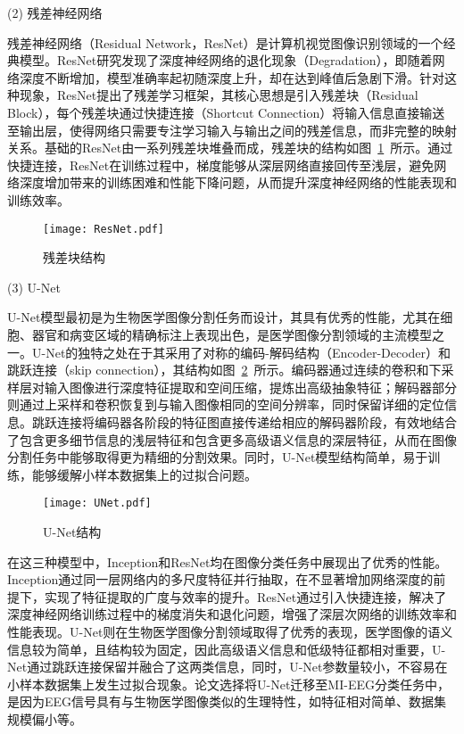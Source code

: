 (2) 残差神经网络

残差神经网络（Residual Network，ResNet）\cite{he2016deep}是计算机视觉图像识别领域的一个经典模型。ResNet研究发现了深度神经网络的退化现象（Degradation），即随着网络深度不断增加，模型准确率起初随深度上升，却在达到峰值后急剧下滑。针对这种现象，ResNet提出了残差学习框架，其核心思想是引入残差块（Residual Block），每个残差块通过快捷连接（Shortcut Connection）将输入信息直接输送至输出层，使得网络只需要专注学习输入与输出之间的残差信息，而非完整的映射关系。基础的ResNet由一系列残差块堆叠而成，残差块的结构如图~\ref{fig:ResNet}~所示。通过快捷连接，ResNet在训练过程中，梯度能够从深层网络直接回传至浅层，避免网络深度增加带来的训练困难和性能下降问题，从而提升深度神经网络的性能表现和训练效率。
\begin{figure}
  \centering
  \texttt{[image: ResNet.pdf]}
  \caption{残差块结构}
  \label{fig:ResNet}
\end{figure}

(3) U-Net

U-Net模型\cite{ronneberger2015u}最初是为生物医学图像分割任务而设计，其具有优秀的性能，尤其在细胞、器官和病变区域的精确标注上表现出色，是医学图像分割领域的主流模型之一。U-Net的独特之处在于其采用了对称的编码-解码结构（Encoder-Decoder）和跳跃连接（skip connection），其结构如图~\ref{fig:UNet}~所示。编码器通过连续的卷积和下采样层对输入图像进行深度特征提取和空间压缩，提炼出高级抽象特征；解码器部分则通过上采样和卷积恢复到与输入图像相同的空间分辨率，同时保留详细的定位信息。跳跃连接将编码器各阶段的特征图直接传递给相应的解码器阶段，有效地结合了包含更多细节信息的浅层特征和包含更多高级语义信息的深层特征，从而在图像分割任务中能够取得更为精细的分割效果。同时，U-Net模型结构简单，易于训练，能够缓解小样本数据集上的过拟合问题。
\begin{figure}
  \centering
  \texttt{[image: UNet.pdf]}
  \caption{U-Net结构}
  \label{fig:UNet}
\end{figure}

在这三种模型中，Inception和ResNet均在图像分类任务中展现出了优秀的性能。Inception通过同一层网络内的多尺度特征并行抽取，在不显著增加网络深度的前提下，实现了特征提取的广度与效率的提升。ResNet通过引入快捷连接，解决了深度神经网络训练过程中的梯度消失和退化问题，增强了深层次网络的训练效率和性能表现。U-Net则在生物医学图像分割领域取得了优秀的表现，医学图像的语义信息较为简单，且结构较为固定，因此高级语义信息和低级特征都相对重要，U-Net通过跳跃连接保留并融合了这两类信息，同时，U-Net参数量较小，不容易在小样本数据集上发生过拟合现象。论文选择将U-Net迁移至MI-EEG分类任务中，是因为EEG信号具有与生物医学图像类似的生理特性，如特征相对简单、数据集规模偏小等。


